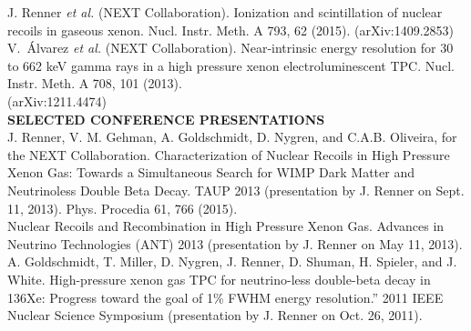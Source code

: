 \noindent J. Renner \emph{et al.} (NEXT Collaboration).  Ionization and scintillation of nuclear recoils in gaseous xenon.  Nucl. Instr. Meth. A 793, 62 (2015).  (arXiv:1409.2853)\\

\noindent V.\ \'{A}lvarez \emph{et al.} (NEXT Collaboration). Near-intrinsic energy resolution for 30 to 662 keV gamma rays in a high pressure xenon electroluminescent TPC. Nucl. Instr. Meth. A 708, 
101 (2013).\\(arXiv:1211.4474)\\

\noindent \textbf{SELECTED CONFERENCE PRESENTATIONS}\\

\noindent J. Renner, V. M. Gehman, A. Goldschmidt, D. Nygren, and C.A.B. Oliveira, for the NEXT Collaboration. 
Characterization of Nuclear Recoils in High Pressure Xenon Gas: Towards a Simultaneous Search for WIMP Dark Matter and Neutrinoless 
Double Beta Decay.  TAUP 2013 (presentation by J. Renner on Sept. 11, 2013). Phys. Procedia 61, 766 (2015).\\

\noindent Nuclear Recoils and Recombination in High Pressure Xenon Gas.  Advances in Neutrino Technologies (ANT) 2013 
(presentation by J. Renner on May 11, 2013).\\

\noindent A. Goldschmidt, T. Miller, D. Nygren, J. Renner, D. Shuman, H. Spieler, and J. White.
High-pressure xenon gas TPC for neutrino-less double-beta decay in 136Xe: Progress toward the goal of 1\% FWHM energy resolution.” 
2011 IEEE Nuclear Science Symposium (presentation by J. Renner on Oct. 26, 2011).\\

